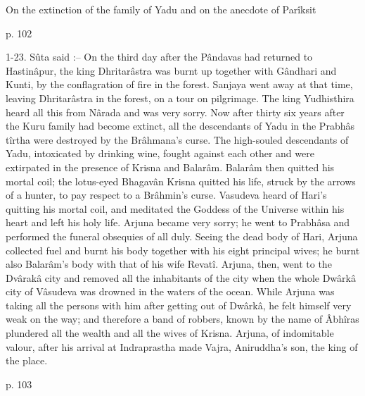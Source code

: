 ﻿On the extinction of the family of Yadu and on the anecdote of Parîksit

 

p. 102

 

1-23. Sûta said :-- On the third day after the Pândavas had returned to Hastinâpur, the king Dhritarâstra was burnt up together with Gândhari and Kunti, by the conflagration of fire in the forest. Sanjaya went away at that time, leaving Dhritarâstra in the forest, on a tour on pilgrimage. The king Yudhisthira heard all this from Nârada and was very sorry. Now after thirty six years after the Kuru family had become extinct, all the descendants of Yadu in the Prabhâs tîrtha were destroyed by the Brâhmana's curse. The high-souled descendants of Yadu, intoxicated by drinking wine, fought against each other and were extirpated in the presence of Krisna and Balarâm. Balarâm then quitted his mortal coil; the lotus-eyed Bhagavân Krisna quitted his life, struck by the arrows of a hunter, to pay respect to a Brâhmin's curse. Vasudeva heard of Hari's quitting his mortal coil, and meditated the Goddess of the Universe within his heart and left his holy life. Arjuna became very sorry; he went to Prabhâsa and performed the funeral obsequies of all duly. Seeing the dead body of Hari, Arjuna collected fuel and burnt his body together with his eight principal wives; he burnt also Balarâm's body with that of his wife Revatî. Arjuna, then, went to the Dvârakâ city and removed all the inhabitants of the city when the whole Dwârkâ city of Vâsudeva was drowned in the waters of the ocean. While Arjuna was taking all the persons with him after getting out of Dwârkâ, he felt himself very weak on the way; and therefore a band of robbers, known by the name of Âbhîras plundered all the wealth and all the wives of Krisna. Arjuna, of indomitable valour, after his arrival at Indraprastha made Vajra, Aniruddha's son, the king of the place.

 

p. 103

 

